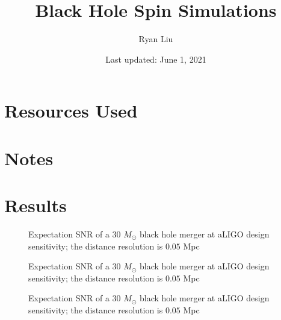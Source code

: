 \documentclass{article}
\title{Black Hole Spin Simulations}
\author{Ryan Liu}
\date{Last updated: June 1, 2021}
\begin{document}
\maketitle

\section{Resources Used}

\section{Notes}

\section{Results}

\begin{figure}[!htb]
    \caption{\label{fig:label} Expectation SNR of a 30 $M_\odot$ black hole merger at aLIGO design sensitivity; the distance resolution is $0.05$ Mpc}
\end{figure}

\begin{figure}[!htb]
    \caption{\label{fig:label} Expectation SNR of a 30 $M_\odot$ black hole merger at aLIGO design sensitivity; the distance resolution is $0.05$ Mpc}
\end{figure}

\begin{figure}[!htb]
    \caption{\label{fig:label} Expectation SNR of a 30 $M_\odot$ black hole merger at aLIGO design sensitivity; the distance resolution is $0.05$ Mpc}
\end{figure}
\end{document}
